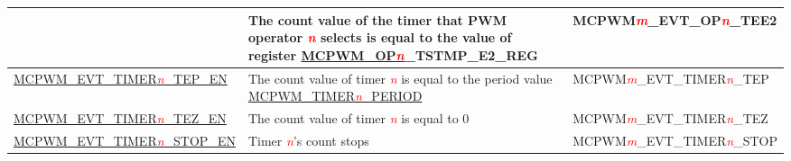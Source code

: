 \begin{ThreePartTable}
\begin{longtable}[c]{| l | L{7cm} | l |}
    & The count value of the timer that PWM operator \textcolor{red}{\it{n}} selects is equal to the value of register \hyperref[regdesc:MCPWMOPNTSTMPE2REG]{MCPWM\_OP\textcolor{red}{\it{n}}}\_TSTMP\_E2\_REG
    & MCPWM\textcolor{red}{\it{m}}\_EVT\_OP\textcolor{red}{\it{n}}\_TEE2    \\\hline
    \hyperref[fielddesc:MCPWMEVTTIMER0TEPEN]{MCPWM\_EVT\_TIMER\textcolor{red}{\it{n}}\_TEP\_EN}
    & The count value of timer \textcolor{red}{\it{n}} is equal to the period value \hyperref[fielddesc:MCPWMTIMERNPERIOD]{MCPWM\_TIMER\textcolor{red}{\it{n}}\_PERIOD}
    & MCPWM\textcolor{red}{\it{m}}\_EVT\_TIMER\textcolor{red}{\it{n}}\_TEP    \\\hline
    \hyperref[fielddesc:MCPWMEVTTIMER0TEZEN]{MCPWM\_EVT\_TIMER\textcolor{red}{\it{n}}\_TEZ\_EN}
    & The count value of timer \textcolor{red}{\it{n}} is equal to 0
    & MCPWM\textcolor{red}{\it{m}}\_EVT\_TIMER\textcolor{red}{\it{n}}\_TEZ    \\\hline
    \hyperref[fielddesc:MCPWMEVTTIMER0STOPEN]{MCPWM\_EVT\_TIMER\textcolor{red}{\it{n}}\_STOP\_EN}
    & Timer \textcolor{red}{\it{n}}'s count stops
    & MCPWM\textcolor{red}{\it{m}}\_EVT\_TIMER\textcolor{red}{\it{n}}\_STOP    \\\hline
\end{longtable}
\end{ThreePartTable}